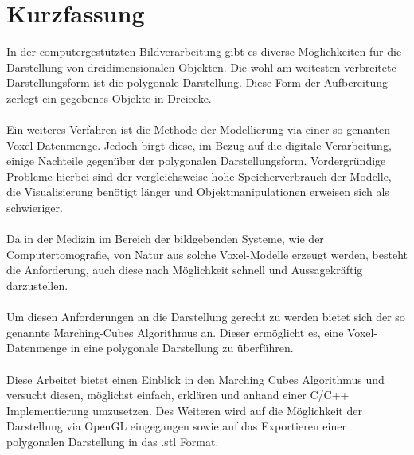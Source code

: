 
\chapter{Kurzfassung}

In der computergestützten Bildverarbeitung gibt es diverse Möglichkeiten für die Darstellung von dreidimensionalen Objekten. Die wohl am weitesten verbreitete Darstellungsform ist die polygonale Darstellung. Diese Form der Aufbereitung zerlegt ein gegebenes Objekte in Dreiecke. 
\\\\
Ein weiteres Verfahren ist die Methode der Modellierung via einer so genanten Voxel-Datenmenge. Jedoch birgt diese, im Bezug auf die digitale Verarbeitung, einige Nachteile gegenüber der polygonalen Darstellungsform. Vordergründige Probleme hierbei sind der vergleichsweise hohe Speicherverbrauch der Modelle, die Visualisierung benötigt länger und Objektmanipulationen erweisen sich als schwieriger.
\\\\
Da in der Medizin im Bereich der bildgebenden Systeme, wie der Computertomografie, von Natur aus solche Voxel-Modelle erzeugt werden, besteht die Anforderung, auch diese nach Möglichkeit schnell und Aussagekräftig darzustellen.
\\\\
Um diesen Anforderungen an die Darstellung gerecht zu werden bietet sich der so genannte Marching-Cubes Algorithmus an. Dieser ermöglicht es, eine Voxel-Datenmenge in eine polygonale Darstellung zu überführen. 
\\\\
Diese Arbeitet bietet einen Einblick in den Marching Cubes Algorithmus und versucht diesen, möglichst einfach, erklären und anhand einer C/C++ Implementierung umzusetzen. Des Weiteren wird auf die Möglichkeit der Darstellung via OpenGL eingegangen sowie auf das Exportieren einer polygonalen Darstellung in das .stl Format.

